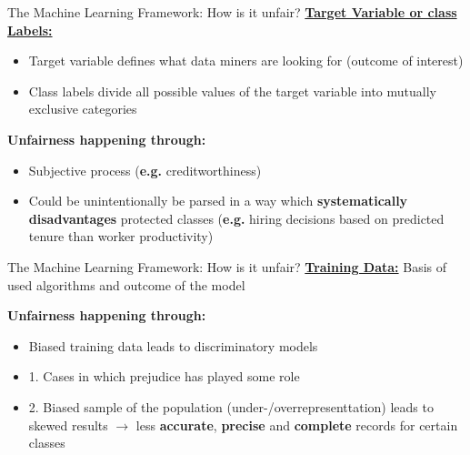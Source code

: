 \begin{frame}{The Machine Learning Framework: How is it unfair? \cite{Barocas.2016, barocas-hardt-narayanan}}
    \underline{\textbf{Target Variable or class Labels:}} \\
    \begin{itemize}
        \item Target variable defines what data miners are looking for (outcome of interest)
        \item Class labels divide all possible values of the target variable into mutually exclusive categories
    \end{itemize}

    \begin{block}{\textbf{Unfairness happening through:}}
    \begin{itemize}
        \item Subjective process (\textbf{e.g.} creditworthiness)
        \item Could be unintentionally be parsed in a way which \textbf{systematically disadvantages} protected classes (\textbf{e.g.} hiring decisions based on predicted tenure than worker productivity)
    \end{itemize}
        \end{block}
\end{frame}

\begin{frame}{The Machine Learning Framework: How is it unfair? \cite{Barocas.2016, barocas-hardt-narayanan}}
    \underline{\textbf{Training Data:}} Basis of used algorithms and outcome of the model \newline 

    \begin{block}{\textbf{Unfairness happening through:}}
    \begin{itemize}
        \item Biased training data leads to discriminatory models
        \item 1. Cases in which prejudice has played some role
        \item 2. Biased sample of the population (under-/overrepresenttation) leads to skewed results\newline
        $\rightarrow$ less \textbf{accurate}, \textbf{precise} and \textbf{complete} records for certain classes
    \end{itemize}
        \end{block}
\end{frame}

